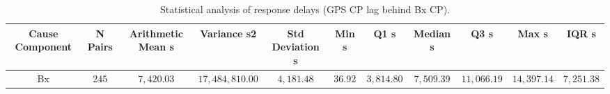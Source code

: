 \vspace{-3pt}
\begin{table}[H]
\caption{Statistical analysis of response delays (GPS CP lag behind Bx CP).\label{tab:Response_Delay_Summary_Statistics_300_Bx}}
\begin{tabularx}{\textwidth}{CCCCCCCCCCC}
\toprule
\textbf{Cause Component} & \textbf{N Pairs} & \textbf{Arithmetic Mean s} & \textbf{Variance s2} & \textbf{Std Deviation s} & \textbf{Min s} & \textbf{Q1 s} & \textbf{Median s} & \textbf{Q3 s} & \textbf{Max s} & \textbf{IQR s} \\
\midrule
Bx & $245$ & $7,420.03$ & $17,484,810.00$ & $4,181.48$ & $36.92$ & $3,814.80$ & $7,509.39$ & $11,066.19$ & $14,397.14$ & $7,251.38$ \\
\bottomrule
\end{tabularx}
\end{table}
\vspace{-3pt}
